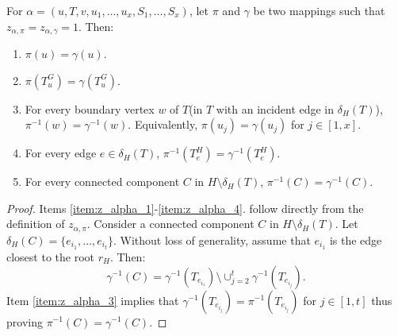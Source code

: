 \begin{lemma}\label{lem:z_alpha_properties}
  For $\alpha = (u,T,v,u_1,\dots,u_x,S_1,\dots,S_x)$, let $\pi$ and
  $\gamma$ be two mappings such that
  $z_{\alpha,\pi}=z_{\alpha,\gamma} = 1$. Then:
  
  \begin{enumerate}

  \item \label{item:z_alpha_1} $\pi(u) = \gamma(u)$.
  
  \item \label{item:z_alpha_2} $\pi(T_u^G) = \gamma(T_u^G)$.
  
  \item \label{item:z_alpha_3}
    For every boundary vertex $w$ of $T$(in $T$ with an incident
    edge in $\delta_H(T)$), $\pi^{-1}(w) =
    \gamma^{-1}(w)$. Equivalently, $\pi(u_j) = \gamma(u_j)$ for
    $j \in [1,x]$.
  \item \label{item:z_alpha_4} For every edge $e \in \delta_H(T)$,
    $\pi^{-1}(T_e^H) = \gamma^{-1}(T_e^H)$.
    
  \item \label{item:z_alpha_5} For every connected component $C$ in
    $H \setminus \delta_H(T)$, $\pi^{-1}(C) = \gamma^{-1}(C)$.
    
  \end{enumerate}  
    
\end{lemma}
%
\begin{proof}
  Items \ref{item:z_alpha_1}-\ref{item:z_alpha_4}.
  follow directly from the definition of $z_{\alpha,\pi}$. Consider a
  connected component $C$ in $H \setminus \delta_H(T)$. Let
  $\delta_H(C) = \{e_{i_1},\dots,e_{i_t}\}$. Without loss of
  generality, assume that $e_{i_1}$ is the edge closest to the root
  $r_H$. Then:
  \begin{equation*}
    \gamma^{-1}(C) = \gamma^{-1}(T_{e_{i_1}}) \setminus \cup_{j=2}^t \gamma^{-1}(T_{e_{i_j}}).
  \end{equation*}
  Item \ref{item:z_alpha_3} implies that
  $\gamma^{-1}(T_{e_{i_j}}) = \pi^{-1}(T_{e_{i_j}})$ for $j \in [1,t]$
  thus proving $\pi^{-1}(C) = \gamma^{-1}(C)$.
\end{proof}

